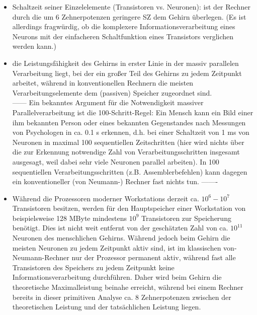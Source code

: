 \begin{itemize}[noitemsep]
\item Schaltzeit seiner Einzelelemente (Transistoren vs. Neuronen): 
ist der Rechner durch die um 6 Zehnerpotenzen geringere SZ dem Gehirn überlegen.
(Es ist allerdings fragwürdig, ob die komplexere Informationsverarbeitung eines
Neurons mit der einfacheren Schaltfunktion eines Transistors verglichen werden kann.)
\item die Leistungsfähigkeit des Gehirns in erster
Linie in der massiv parallelen Verarbeitung liegt, bei der ein großer Teil des
Gehirns zu jedem Zeitpunkt arbeitet, während in konventionellen Rechnern die
meisten Verarbeitungselemente dem (passiven) Speicher zugeordnet sind. \\
------
Ein bekanntes Argument für die Notwendigkeit massiver Parallelverarbeitung ist
die 100-Schritt-Regel: Ein Mensch kann ein Bild einer ihm bekannten Person oder
eines bekannten Gegenstandes nach Messungen von Psychologen in ca. 0.1 s
erkennen, d.h. bei einer Schaltzeit von 1 ms von Neuronen in maximal 100
sequentiellen Zeitschritten (hier wird nichts über die zur Erkennung notwendige
Zahl von Verarbeitungsschritten insgesamt ausgesagt, weil dabei sehr viele
Neuronen parallel arbeiten). In 100 sequentiellen Verarbeitungsschritten (z.B.
Assemblerbefehlen) kann dagegen ein konventioneller (von Neumann-) Rechner
fast nichts tun.
-------
\item  Während die Prozessoren moderner Workstations derzeit ca. $10^6 - 10^7$ Transistoren besitzen,
werden für den Hauptspeicher einer Workstation von beispielsweise 128 MByte
mindestens $10^9$ Transistoren zur Speicherung benötigt. Dies ist nicht weit entfernt
von der geschätzten Zahl von ca. $10^11$ Neuronen des menschlichen Gehirns.
Während jedoch beim Gehirn die meisten Neuronen zu jedem Zeitpunkt aktiv sind,
ist im klassischen von-Neumann-Rechner nur der Prozessor permanent aktiv,
während fast alle Transistoren des Speichers zu jedem Zeitpunkt keine
Informationsverarbeitung durchführen. Daher wird beim Gehirn die theoretische
Maximalleistung beinahe erreicht, während bei einem Rechner bereits in dieser
primitiven Analyse ca. 8 Zehnerpotenzen zwischen der theoretischen Leistung und
der tatsächlichen Leistung liegen.
\end{itemize}

